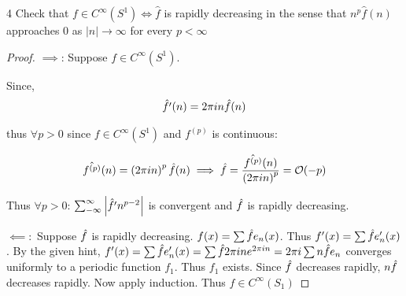 \documentclass{article}
\newcommand{\h}[1]{\Hat{#1}}
\newcommand{\abs}[1]{\left\lvert #1\right\rvert}
\begin{document}
\bigskip

\begin{PROB}{4}\label{Problem 4.}
    Check that $f \in C^\infty(S^1) \iff \hat{f}$ is rapidly decreasing in the sense that $n^p\hat{f}(n)$ approaches 0 as $\abs{n} \to \infty$ for every $p < \infty$    
\end{PROB}
\begin{proof}
    $\implies$: Suppose $f \in C^\infty(S^1)$. 
    
    Since, \begin{align*}
        \h{ f'}(n) = 2 \pi i n \h{f}(n)
    \end{align*}
    
    thus $\forall p > 0$ since $f \in C^{\infty}(S^1)$ and $f^{(p)}$ is continuous:
    
    \begin{align*}
        \h{f^{(p)}}(n) = \left(2 \pi i n\right)^p\h{f}(n) \implies \h{f} = \frac{\h{f^{(p)}}(n) }{\left(2 \pi i n\right)^p} = \mathcal{O}(-p)
    \end{align*}

    Thus $\forall p > 0$: $\sum_{-\infty}^{\infty} \abs{\h{f'}n^{p - 2}}$ is convergent and $\h{f}$ is rapidly decreasing.
    
    $\impliedby: $ Suppose $\h{f}$ is rapidly decreasing. $f(x) = \sum \h{f} e_n(x)$. Thus $f'(x) = \sum \h{f} e_n'(x)$. By the given hint, $f'(x) = \sum \h{f} e_n'(x) = \sum \h{f} 2 \pi i n e^{2 \pi i n} = 2 \pi i \sum n\h{f} e_n$ converges uniformly to a periodic function $f_1$. Thus $f_1$ exists. Since $\h{f}$ decreases rapidly, $n \h{f}$ decreases rapidly. Now apply induction. Thus $f \in C^\infty(S_1)$           
\end{proof}

\bigskip
\end{document}
